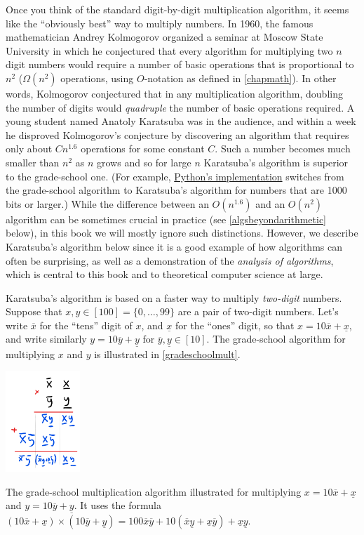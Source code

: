 Once you think of the standard digit-by-digit multiplication algorithm,
it seems like the ``obviously best'' way to multiply numbers. In 1960,
the famous mathematician Andrey Kolmogorov organized a seminar at Moscow
State University in which he conjectured that every algorithm for
multiplying two \(n\) digit numbers would require a number of basic
operations that is proportional to \(n^2\) (\(\Omega(n^2)\) operations,
using \(O\)-notation as defined in \cref{chapmath}). In other words,
Kolmogorov conjectured that in any multiplication algorithm, doubling
the number of digits would \emph{quadruple} the number of basic
operations required. A young student named Anatoly Karatsuba was in the
audience, and within a week he disproved Kolmogorov's conjecture by
discovering an algorithm that requires only about \(Cn^{1.6}\)
operations for some constant \(C\). Such a number becomes much smaller
than \(n^2\) as \(n\) grows and so for large \(n\) Karatsuba's algorithm
is superior to the grade-school one. (For example,
\href{https://svn.python.org/projects/python/trunk/Objects/longobject.c}{Python's
implementation} switches from the grade-school algorithm to Karatsuba's
algorithm for numbers that are 1000 bits or larger.) While the
difference between an \(O(n^{1.6})\) and an \(O(n^2)\) algorithm can be
sometimes crucial in practice (see \cref{algsbeyondarithmetic} below),
in this book we will mostly ignore such distinctions. However, we
describe Karatsuba's algorithm below since it is a good example of how
algorithms can often be surprising, as well as a demonstration of the
\emph{analysis of algorithms}, which is central to this book and to
theoretical computer science at large.

Karatsuba's algorithm is based on a faster way to multiply
\emph{two-digit} numbers. Suppose that
\(x,y \in [100]=\{0,\ldots, 99 \}\) are a pair of two-digit numbers.
Let's write \(\overline{x}\) for the ``tens'' digit of \(x\), and
\(\underline{x}\) for the ``ones'' digit, so that
\(x = 10\overline{x} + \underline{x}\), and write similarly
\(y = 10\overline{y} + \underline{y}\) for
\(\overline{y},\underline{y} \in [10]\). The grade-school algorithm for
multiplying \(x\) and \(y\) is illustrated in \cref{gradeschoolmult}.


\begin{marginfigure}
\centering
\includegraphics[width=\linewidth, height=1.5in, keepaspectratio]{../figure/gradeschoolmult.png}
\caption{The grade-school multiplication algorithm illustrated for
multiplying \(x=10\overline{x}+\underline{x}\) and
\(y=10\overline{y}+\underline{y}\). It uses the formula
\((10\overline{x}+\underline{x}) \times (10 \overline{y}+\underline{y}) = 100\overline{x}\overline{y}+10(\overline{x}\underline{y} + \underline{x}\overline{y}) + \underline{x}\underline{y}\).}
\label{gradeschoolmult}
\end{marginfigure}


